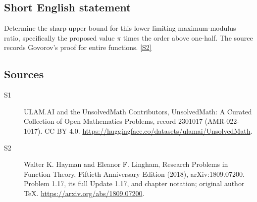 \documentclass[11pt]{article}
\newcommand{\sref}[2]{\hyperlink{source:#1:#2}{[S#2]}}
\begin{document}
\subsection{Short English statement}
Determine the sharp upper bound for this lower limiting maximum-modulus ratio, specifically the proposed value $\pi$ times the order above one-half. The source records Govorov’s proof for entire functions. \sref{2301017}{2}
\subsection{Sources}
\begin{description}
\item[\hypertarget{source:2301017:1}{S1}] ULAM.AI and the UnsolvedMath Contributors, UnsolvedMath: A Curated Collection of Open Mathematics Problems, record 2301017 (AMR-022-1017). CC BY 4.0. \url{https://huggingface.co/datasets/ulamai/UnsolvedMath}.
\item[\hypertarget{source:2301017:2}{S2}] Walter K. Hayman and Eleanor F. Lingham, Research Problems in Function Theory, Fiftieth Anniversary Edition (2018), arXiv:1809.07200. Problem 1.17, its full Update 1.17, and chapter notation; original author TeX. \url{https://arxiv.org/abs/1809.07200}.
\end{description}
\label{end:2301017}
\end{document}
